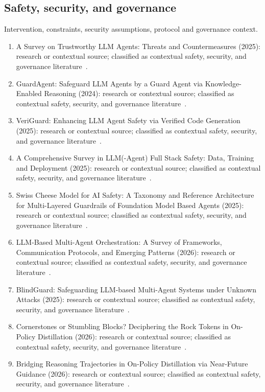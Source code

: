 \subsection{Safety, security, and governance}
Intervention, constraints, security assumptions, protocol and governance context.
\begin{enumerate}
\setlength{\itemsep}{1pt}\setlength{\parskip}{0pt}
\footnotesize
\item A Survey on Trustworthy {LLM} Agents: Threats and Countermeasures (2025): research or contextual source; classified as contextual safety, security, and governance literature~\cite{ext018}.
\item {GuardAgent}: Safeguard {LLM} Agents by a Guard Agent via Knowledge-Enabled Reasoning (2024): research or contextual source; classified as contextual safety, security, and governance literature~\cite{ext019}.
\item {VeriGuard}: Enhancing {LLM} Agent Safety via Verified Code Generation (2025): research or contextual source; classified as contextual safety, security, and governance literature~\cite{ext020}.
\item A Comprehensive Survey in {LLM}(-Agent) Full Stack Safety: Data, Training and Deployment (2025): research or contextual source; classified as contextual safety, security, and governance literature~\cite{ext022}.
\item Swiss Cheese Model for {AI} Safety: A Taxonomy and Reference Architecture for Multi-Layered Guardrails of Foundation Model Based Agents (2025): research or contextual source; classified as contextual safety, security, and governance literature~\cite{ext033}.
\item {LLM}-Based Multi-Agent Orchestration: A Survey of Frameworks, Communication Protocols, and Emerging Patterns (2026): research or contextual source; classified as contextual safety, security, and governance literature~\cite{ext048}.
\item {BlindGuard}: Safeguarding {LLM}-based Multi-Agent Systems under Unknown Attacks (2025): research or contextual source; classified as contextual safety, security, and governance literature~\cite{ext054}.
\item Cornerstones or Stumbling Blocks? Deciphering the Rock Tokens in On-Policy Distillation (2026): research or contextual source; classified as contextual safety, security, and governance literature~\cite{ext058}.
\item Bridging Reasoning Trajectories in On-Policy Distillation via Near-Future Guidance (2026): research or contextual source; classified as contextual safety, security, and governance literature~\cite{ext062}.

\end{enumerate}
